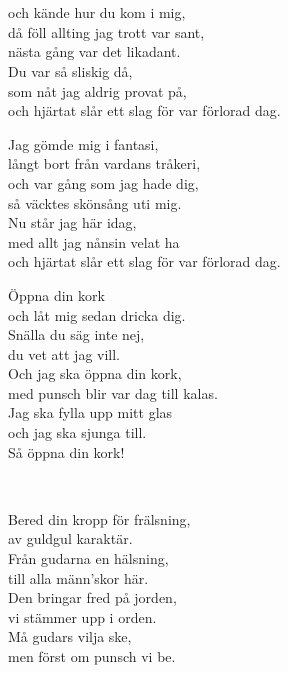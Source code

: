 
\newpage

 \\       

\\
och kände hur du kom i mig,\\
då föll allting jag trott var sant,\\
nästa gång var det likadant.\\
Du var så sliskig då,\\
som nåt jag aldrig provat på,\\
och hjärtat slår ett slag för var förlorad dag.

Jag gömde mig i fantasi,\\
långt bort från vardans tråkeri,\\
och var gång som jag hade dig,\\
så väcktes skönsång uti mig.\\
Nu står jag här idag,\\
med allt jag nånsin velat ha\\
och hjärtat slår ett slag för var förlorad dag.

Öppna din kork\\
och låt mig sedan dricka dig.\\
Snälla du säg inte nej,\\
du vet att jag vill.\\
Och jag ska öppna din kork,\\
med punsch blir var dag till kalas.\\
Jag ska fylla upp mitt glas\\
och jag ska sjunga till.\\
Så öppna din kork!

\newpage

 \\       

\songtext{}
Bered din kropp för frälsning,\\
av guldgul karaktär.\\
Från gudarna en hälsning,\\
till alla männ'skor här.\\
Den bringar fred på jorden,\\
vi stämmer upp i orden.\\
Må gudars vilja ske,\\
men först om punsch vi be.

